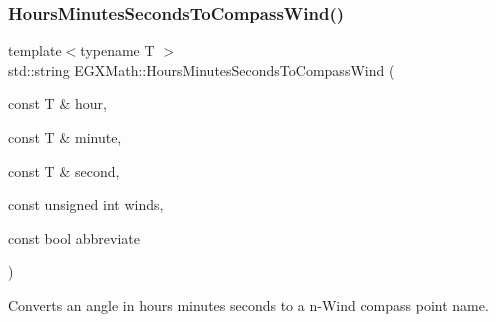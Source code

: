 \mbox{\label{group___e_g_x_math-_angle_conversions-_hours_minutes_seconds_gacb8fc46aacbc82db6852dfc9c42c77df}} 
\subsubsection{\texorpdfstring{Hours\+Minutes\+Seconds\+To\+Compass\+Wind()}{HoursMinutesSecondsToCompassWind()}}
{\footnotesize\ttfamily template$<$typename T $>$ \\
std\+::string E\+G\+X\+Math\+::\+Hours\+Minutes\+Seconds\+To\+Compass\+Wind (\begin{DoxyParamCaption}\item[{const T \&}]{hour,  }\item[{const T \&}]{minute,  }\item[{const T \&}]{second,  }\item[{const unsigned int}]{winds,  }\item[{const bool}]{abbreviate }\end{DoxyParamCaption})}



Converts an angle in hours minutes seconds to a n-\/\+Wind compass point name. 

